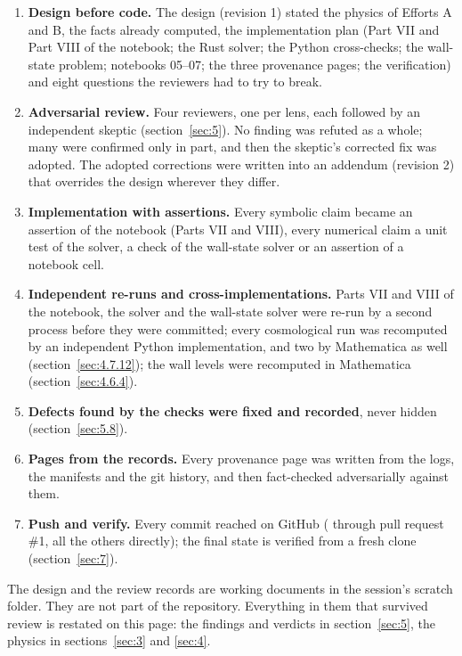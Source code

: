 \begin{enumerate}
  \item \textbf{Design before code.} The design (revision 1) stated the physics of Efforts A and B, the facts already computed, the implementation plan (Part VII and Part VIII of the notebook; the Rust solver; the Python cross-checks; the wall-state problem; notebooks 05--07; the three provenance pages; the verification) and eight questions the reviewers had to try to break.
  \item \textbf{Adversarial review.} Four reviewers, one per lens, each followed by an independent skeptic (section~\ref{sec:5}). No finding was refuted as a whole; many were confirmed only in part, and then the skeptic's corrected fix was adopted. The adopted corrections were written into an addendum (revision 2) that overrides the design wherever they differ.
  \item \textbf{Implementation with assertions.} Every symbolic claim became an assertion of the notebook (Parts VII and VIII), every numerical claim a unit test of the solver, a check of the wall-state solver or an assertion of a notebook cell.
  \item \textbf{Independent re-runs and cross-implementations.} Parts VII and VIII of the notebook, the solver and the wall-state solver were re-run by a second process before they were committed; every cosmological run was recomputed by an independent Python implementation, and two by Mathematica as well (section~\ref{sec:4.7.12}); the wall levels were recomputed in Mathematica (section~\ref{sec:4.6.4}).
  \item \textbf{Defects found by the checks were fixed and recorded}, never hidden (section~\ref{sec:5.8}).
  \item \textbf{Pages from the records.} Every provenance page was written from the logs, the manifests and the git history, and then fact-checked adversarially against them.
  \item \textbf{Push and verify.} Every commit reached  on GitHub ( through pull request \#1, all the others directly); the final state is verified from a fresh clone (section~\ref{sec:7}).
\end{enumerate}

The design and the review records are working documents in the session's scratch folder. They are not part of the repository. Everything in them that survived review is restated on this page: the findings and verdicts in section~\ref{sec:5}, the physics in sections~\ref{sec:3} and \ref{sec:4}.

